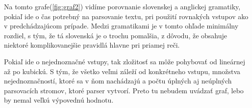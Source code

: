 \documentclass[12pt,a4paper]{report}
\theoremstyle{definition}
\theoremstyle{remark}
\begin{document}
Na tomto grafe(\ref{fig:graf2}) vidíme porovnanie slovenskej a anglickej gramatiky, pokiaľ ide o čas potrebný na parsovanie textu, pri použití rovnakých vstupov ako v predchádzajúcom prípade. Medzi gramatikami je v tomto ohľade minimálny rozdiel, s tým, že tá slovenská je o trochu pomalšia, z dôvodu, že obsahuje niektoré komplikovanejšie pravidlá hlavne pri priamej reči.

Pokiaľ ide o nejednoznačné vstupy, tak zložitosť sa môže pohybovať od lineárnej až po kubickú. S tým, že všetko veľmi záleží od konkrétneho vstupu,  množstva nejednoznačností, ktoré sa v ňom nachádzajú a počtu úplných aj neúplných parsovacích stromov, ktoré parser vytvorí. Preto tu nebudem uvádzať graf, lebo by nemal veľkú výpovednú hodnotu. 



\end{document}
